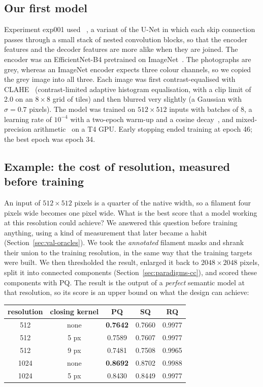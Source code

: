\subsection{Our first model}\label{sec:par-exp001}
Experiment exp001 used ~\citep{unetpp}, a variant of the U-Net in which each skip
connection passes through a small stack of nested convolution blocks, so that the encoder features
and the decoder features are more alike when they are joined. The encoder was an EfficientNet-B4
pretrained on ImageNet~\citep{deng2009}. The photographs are grey, whereas an ImageNet encoder
expects three colour channels, so we copied the grey image into all three. Each image was first
contrast-equalised with CLAHE~\citep{zuiderveld1994} (contrast-limited adaptive histogram
equalisation, with a clip limit of 2.0 on an $8\times8$
grid of tiles) and then blurred very slightly (a Gaussian with $\sigma=0.7$ pixels). The model was
trained on $512\times512$ inputs with batches of 8, a learning rate of $10^{-4}$ with a two-epoch
warm-up and a cosine decay~\citep{sgdr}, and mixed-precision arithmetic~\citep{mixedprecision} on
a T4 GPU. Early stopping ended
training at epoch 46; the best epoch was epoch 34.

\subsection{Example: the cost of resolution, measured before training}\label{sec:par-ceiling}
An input of $512\times512$ pixels is a quarter of the native width, so a filament four pixels wide
becomes one pixel wide. What is the best score that a model working at this resolution could
achieve? We answered this question before training anything, using a kind of measurement
that later became a habit (Section~\ref{sec:val-oracles}). We took the \emph{annotated} filament
masks and shrank their union to the training resolution, in the same way that the training targets
were built. We then thresholded the result, enlarged it back to $2048\times2048$ pixels, split it
into connected components (Section~\ref{sec:paradigms-cc}), and scored these components with PQ.
The result is the output of a \emph{perfect} semantic model at that resolution, so its score is an
upper bound on what the design can achieve:
\begin{center}\small
\begin{tabular}{@{}ccccc@{}}
\toprule
resolution & closing kernel & PQ & SQ & RQ \\
\midrule
512 & none & \textbf{0.7642} & 0.7660 & 0.9977 \\
512 & 5 px & 0.7589 & 0.7607 & 0.9977 \\
512 & 9 px & 0.7481 & 0.7508 & 0.9965 \\
1024 & none & \textbf{0.8692} & 0.8702 & 0.9988 \\
1024 & 5 px & 0.8430 & 0.8449 & 0.9977 \\
\bottomrule
\end{tabular}
\end{center}

